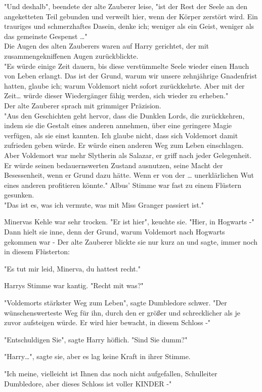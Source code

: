 {"Und deshalb", beendete der alte Zauberer leise, "ist der Rest der Seele an den angeketteten Teil gebunden und verweilt hier, wenn der Körper zerstört wird. Ein trauriges und schmerzhaftes Dasein, denke ich; weniger als ein Geist, weniger als das gemeinste Gespenst …"\\ Die Augen des alten Zauberers waren auf Harry gerichtet, der mit zusammengekniffenen Augen zurückblickte.\\ "Es würde einige Zeit dauern, bis diese verstümmelte Seele wieder einen Hauch von Leben erlangt. Das ist der Grund, warum wir unsere zehnjährige Gnadenfrist hatten, glaube ich; warum Voldemort nicht sofort zurückkehrte. Aber mit der Zeit… würde dieser Wiedergänger fähig werden, sich wieder zu erheben."\\ Der alte Zauberer sprach mit grimmiger Präzision.\\ "Aus den Geschichten geht hervor, dass die Dunklen Lords, die zurückkehren, indem sie die Gestalt eines anderen annehmen, über eine geringere Magie verfügen, als sie einst kannten. Ich glaube nicht, dass sich Voldemort damit zufrieden geben würde. Er würde einen anderen Weg zum Leben einschlagen. Aber Voldemort war mehr Slytherin als Salazar, er griff nach jeder Gelegenheit. Er würde seinen bedauernswerten Zustand ausnutzen, seine Macht der Besessenheit, wenn er Grund dazu hätte. Wenn er von der … unerklärlichen Wut eines anderen profitieren könnte." Albus' Stimme war fast zu einem Flüstern gesunken.\\ "Das ist es, was ich vermute, was mit Miss Granger passiert ist."

Minervas Kehle war sehr trocken. "Er ist hier", keuchte sie. "Hier, in Hogwarts -" Dann hielt sie inne, denn der Grund, warum Voldemort nach Hogwarts gekommen war - Der alte Zauberer blickte sie nur kurz an und sagte, immer noch in diesem Flüsterton:

"Es tut mir leid, Minerva, du hattest recht."

Harrys Stimme war kantig. "Recht mit was?"

"Voldemorts stärkster Weg zum Leben", sagte Dumbledore schwer. "Der wünschenswerteste Weg für ihn, durch den er größer und schrecklicher als je zuvor aufsteigen würde. Er wird hier bewacht, in diesem Schloss -"

"Entschuldigen Sie", sagte Harry höflich. "Sind Sie dumm?"

"Harry…", sagte sie, aber es lag keine Kraft in ihrer Stimme.

"Ich meine, vielleicht ist Ihnen das noch nicht aufgefallen, Schulleiter Dumbledore, aber dieses Schloss ist voller KINDER -"

}
